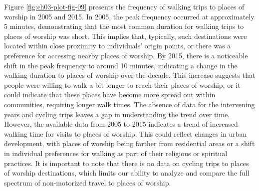 \documentclass[
11pt, %
oneside, %
english, %
singlespacing, %
]{macthesis} %
\begin{document}
Figure \ref{fig:ch03-plot-fig-09} presents the frequency of walking trips to places of worship in 2005 and 2015. In 2005, the peak frequency occurred at approximately 5 minutes, demonstrating that the most common duration for walking trips to places of worship was short. This implies that, typically, such destinations were located within close proximity to individuals' origin points, or there was a preference for accessing nearby places of worship. By 2015, there is a noticeable shift in the peak frequency to around 10 minutes, indicating a change in the walking duration to places of worship over the decade. This increase suggests that people were willing to walk a bit longer to reach their places of worship, or it could indicate that these places have become more spread out within communities, requiring longer walk times. The absence of data for the intervening years and cycling trips leaves a gap in understanding the trend over time. However, the available data from 2005 to 2015 indicates a trend of increased walking time for visits to places of worship. This could reflect changes in urban development, with places of worship being farther from residential areas or a shift in individual preferences for walking as part of their religious or spiritual practices. It is important to note that there is no data on cycling trips to places of worship destinations, which limits our ability to analyze and compare the full spectrum of non-motorized travel to places of worship.
\end{document}
